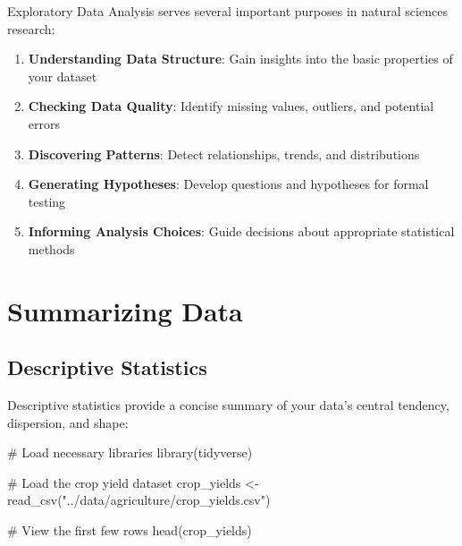 \documentclass[
  letterpaper,
]{book}
\newenvironment{Shaded}{\begin{snugshade}}{\end{snugshade}}
\newcommand{\CommentTok}[1]{\textcolor[rgb]{0.37,0.37,0.37}{#1}}
\newcommand{\FunctionTok}[1]{\textcolor[rgb]{0.28,0.35,0.67}{#1}}
\newcommand{\NormalTok}[1]{\textcolor[rgb]{0.00,0.23,0.31}{#1}}
\newcommand{\OtherTok}[1]{\textcolor[rgb]{0.00,0.23,0.31}{#1}}
\newcommand{\StringTok}[1]{\textcolor[rgb]{0.13,0.47,0.30}{#1}}
\providecommand{\tightlist}{%
  \setlength{\itemsep}{0pt}\setlength{\parskip}{0pt}}
\begin{document}
Exploratory Data Analysis serves several important purposes in natural
sciences research:

\begin{enumerate}
\def\labelenumi{\arabic{enumi}.}
\tightlist
\item
  \textbf{Understanding Data Structure}: Gain insights into the basic
  properties of your dataset
\item
  \textbf{Checking Data Quality}: Identify missing values, outliers, and
  potential errors
\item
  \textbf{Discovering Patterns}: Detect relationships, trends, and
  distributions
\item
  \textbf{Generating Hypotheses}: Develop questions and hypotheses for
  formal testing
\item
  \textbf{Informing Analysis Choices}: Guide decisions about appropriate
  statistical methods
\end{enumerate}

\section{Summarizing Data}\label{summarizing-data}

\subsection{Descriptive Statistics}\label{descriptive-statistics}

Descriptive statistics provide a concise summary of your data's central
tendency, dispersion, and shape:

\begin{Shaded}
\begin{Highlighting}[]
\CommentTok{\# Load necessary libraries}
\FunctionTok{library}\NormalTok{(tidyverse)}

\CommentTok{\# Load the crop yield dataset}
\NormalTok{crop\_yields }\OtherTok{\textless{}{-}} \FunctionTok{read\_csv}\NormalTok{(}\StringTok{"../data/agriculture/crop\_yields.csv"}\NormalTok{)}

\CommentTok{\# View the first few rows}
\FunctionTok{head}\NormalTok{(crop\_yields)}
\end{Highlighting}
\end{Shaded}
\end{document}

